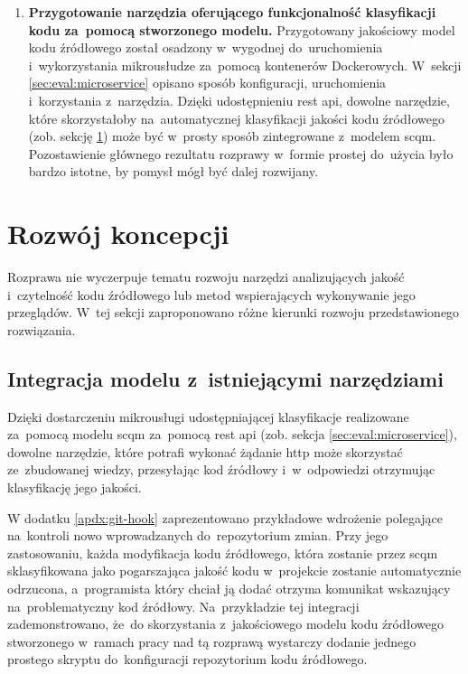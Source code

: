 \documentclass[twoside]{praca}
\begin{document}
\begin{enumerate}
    \item \textbf{Przygotowanie narzędzia oferującego funkcjonalność klasyfikacji kodu za~pomocą stworzonego modelu.} Przygotowany jakościowy model kodu źródłowego został osadzony w~wygodnej do~uruchomienia i~wykorzystania mikrousłudze za~pomocą kontenerów Dockerowych. W~sekcji \ref{sec:eval:microservice} opisano sposób konfiguracji, uruchomienia i~korzystania z~narzędzia. Dzięki udostępnieniu \gls{rest} \gls{api}, dowolne narzędzie, które skorzystałoby na~automatycznej klasyfikacji jakości kodu źródłowego (zob. sekcję \ref{sec:conclustions:further}) może być w~prosty sposób zintegrowane z~modelem \gls{scqm}. Pozostawienie głównego rezultatu rozprawy w~formie prostej do~użycia było bardzo istotne, by pomysł mógł być dalej rozwijany.
\end{enumerate}

\section{Rozwój koncepcji}
\label{sec:conclustions:further}

Rozprawa nie wyczerpuje tematu rozwoju narzędzi analizujących jakość i~czytelność kodu źródłowego lub metod wspierających wykonywanie jego przeglądów. W~tej sekcji zaproponowano różne kierunki rozwoju przedstawionego rozwiązania.

\subsection{Integracja modelu z~istniejącymi narzędziami}

Dzięki dostarczeniu mikrousługi udostępniającej klasyfikacje realizowane za~pomocą modelu \gls{scqm} za~pomocą \gls{rest} \gls{api} (zob. sekcja \ref{sec:eval:microservice}), dowolne narzędzie, które potrafi wykonać żądanie \gls{http} może skorzystać ze~zbudowanej wiedzy, przesyłając kod źródłowy i~w~odpowiedzi otrzymując klasyfikację jego jakości.

W dodatku \ref{apdx:git-hook} zaprezentowano przykładowe wdrożenie polegające na~kontroli nowo wprowadzanych do~repozytorium zmian. Przy jego zastosowaniu, każda modyfikacja kodu źródłowego, która zostanie przez \gls{scqm} sklasyfikowana jako pogarszająca jakość kodu w~projekcie zostanie automatycznie odrzucona, a~programista który chciał ją dodać otrzyma komunikat wskazujący na~problematyczny kod źródłowy. Na~przykładzie tej integracji zademonstrowano, że~do skorzystania z~jakościowego modelu kodu źródłowego stworzonego w~ramach pracy nad tą rozprawą wystarczy dodanie jednego prostego skryptu do~konfiguracji repozytorium kodu źródłowego.
\end{document}
